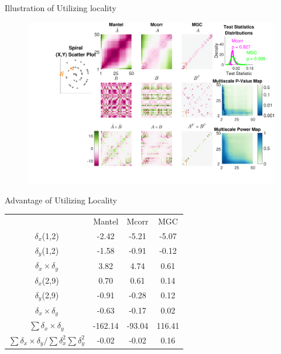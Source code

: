 \documentclass{beamer}
\begin{document}
\begin{frame}{Illustration of Utilizing locality}
\begin{figure}[htbp]
\includegraphics[width=1.0\textwidth]{../Figures/FigA}
\end{figure}
\end{frame}

\begin{frame}{Advantage of Utilizing Locality}
\begin{tabular}{c  c  c  c}
 & Mantel & Mcorr & MGC \\
 $\delta_x$(1,2) & \hspace{1.8em} \color{magenta}-2.42 \hspace{1.8em}  & \hspace{1.8em} \color{magenta}-5.21 \hspace{1.8em} & \hspace{1.8em} \color{magenta}-5.07 \hspace{1.8em}  \\ 
 $\delta_y$(1,2) & \color{magenta}-1.58 & \color{magenta}-0.91 & \color{magenta}-0.12  \\ 
 $\delta_x \times \delta_y$ & \color{blue}3.82 & \color{blue}4.74 & \color{blue}0.61  \\ 
 
\hline


 $\delta_x$(2,9) & \color{blue}0.70 & \color{blue}0.61 & \color{blue}0.14  \\ 
 $\delta_y$(2,9) &  \color{magenta}-0.91 & \color{magenta}-0.28 & \color{blue}0.12  \\ 
 $\delta_x \times \delta_y$ & \color{magenta}-0.63 & \color{magenta}-0.17 & \color{blue}0.02  \\ 

\hline
 $\sum{\delta_x \times \delta_y}$ & \color{magenta}-162.14   & \color{magenta}-93.04 & \color{blue}116.41  \\ 
$\sum{\delta_x \times \delta_y} / \sum{\delta_{x}^2}\sum{\delta_{y}^2}$ &  \color{magenta}-0.02  & \color{magenta}-0.02 & \color{blue}0.16  \\ 

\end{tabular}
\end{frame}
\end{document}

